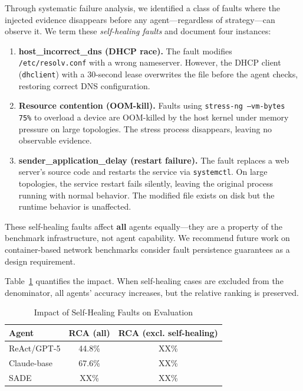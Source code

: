 \documentclass[conference]{IEEEtran}
\begin{document}
Through systematic failure analysis, we identified a class of faults where the injected evidence disappears before any agent---regardless of strategy---can observe it. We term these \emph{self-healing faults} and document four instances:

\begin{enumerate}    \item \textbf{host\_incorrect\_dns (DHCP race).} The fault modifies \texttt{/etc/resolv.conf} with a wrong nameserver. However, the DHCP client (\texttt{dhclient}) with a 30-second lease overwrites the file before the agent checks, restoring correct DNS configuration.

    \item \textbf{Resource contention (OOM-kill).} Faults using \texttt{stress-ng --vm-bytes 75\%} to overload a device are OOM-killed by the host kernel under memory pressure on large topologies. The stress process disappears, leaving no observable evidence.

    \item \textbf{sender\_application\_delay (restart failure).} The fault replaces a web server's source code and restarts the service via \texttt{systemctl}. On large topologies, the service restart fails silently, leaving the original process running with normal behavior. The modified file exists on disk but the runtime behavior is unaffected.
\end{enumerate}

These self-healing faults affect \textbf{all} agents equally---they are a property of the benchmark infrastructure, not agent capability. We recommend future work on container-based network benchmarks consider fault persistence guarantees as a design requirement.

Table~\ref{tab:selfhealing} quantifies the impact. When self-healing cases are excluded from the denominator, all agents' accuracy increases, but the relative ranking is preserved.

\begin{table}[t]
\centering
\caption{Impact of Self-Healing Faults on Evaluation}
\label{tab:selfhealing}
\small
\begin{tabular}{@{}lcc@{}}
\toprule
\textbf{Agent} & \textbf{RCA (all)} & \textbf{RCA (excl. self-healing)} \\
\midrule
ReAct/GPT-5 & 44.8\% & XX\% \\
Claude-base & 67.6\% & XX\% \\
SADE & XX\% & XX\% \\
\bottomrule
\end{tabular}
\end{table}
\end{document}
